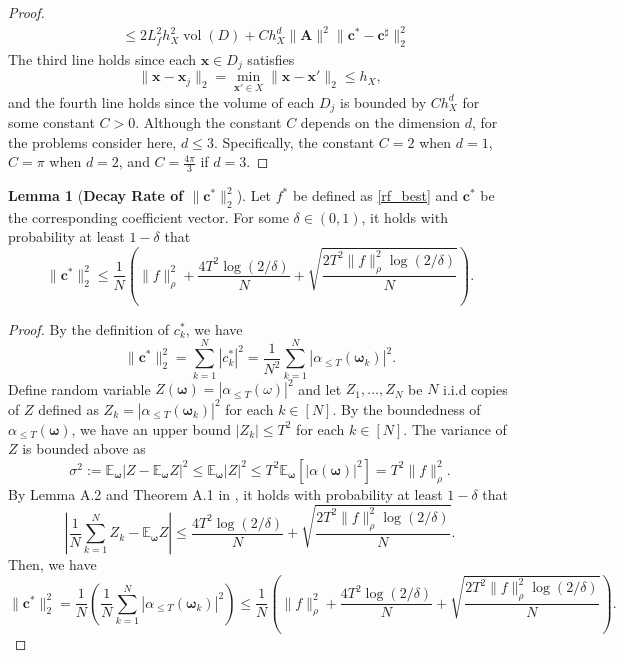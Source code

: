 \documentclass[11pt,twoside]{article}
\theoremstyle{plain}
\theoremstyle{definition}
\newtheorem{lemma}{Lemma}[section]
\theoremstyle{remark}
\newcommand{\E}{\mathbb{E}}
\newcommand{\Ab}{\mathbf{A}}
\newcommand{\xb}{\mathbf{x}}
\newcommand{\cb}{\mathbf{c}}
\newcommand{\vol}{\mathop{\mathrm{vol}}}
\newcommand{\omegab}{\boldsymbol\omega}
\begin{document}
\begin{proof}
\begin{equation}
\begin{aligned}
& \leq 2L_f^2h_X^2\vol(D) + Ch_X^d\|\Ab\|^2 \| \cb^* - \cb^\sharp\|_2^2
\end{aligned}
\end{equation}
The third line holds since each $\xb\in D_j$ satisfies 
\begin{equation*}
\|\xb - \xb_j \|_2 = \min_{\xb'\in X} \|\xb-\xb'\|_2 \leq h_X,
\end{equation*}
and the fourth line holds since the volume of each $D_j$ is bounded by $Ch_X^d$ for some constant $C>0$. Although the constant $C$ depends on the dimension $d$, for the problems consider here, $d\leq3$. Specifically, the constant $C=2$ when $d=1$, $C=\pi$ when $d=2$, and $C=\frac{4\pi}{3}$ if $d=3$. 
\end{proof}

\begin{lemma}[{\bf Decay Rate of $\|\cb^*\|_2^2$}]
\label{decay_c}
Let $f^*$ be defined as \eqref{rf_best} and $\cb^*$ be the corresponding coefficient vector. For some $\delta\in(0,1)$, it holds with probability at least $1-\delta$ that
\begin{equation*}
\|\cb^*\|_2^2 \leq \frac{1}{N} \left( \|f\|_\rho^2 + \frac{4T^2\log(2/\delta)}{N} + \sqrt{\frac{2T^2\|f\|_\rho^2\log(2/\delta)}{N}} \right).
\end{equation*}
\end{lemma}
\begin{proof}
By the definition of $c_k^*$, we have
\begin{equation}
\|\cb^*\|_2^2 = \sum_{k=1}^N |c_k^*|^2 = \frac{1}{N^2} \sum_{k=1}^N |\alpha_{\leq T}(\omegab_k)|^2.     
\end{equation}
Define random variable $Z(\omegab) = |\alpha_{\leq T}(\omega)|^2$ and let $Z_1,\dots, Z_N$ be $N$ i.i.d copies of $Z$ defined as $Z_k = |\alpha_{\leq T}(\omegab_k)|^2$ for each $k\in[N]$.
By the boundedness of $\alpha_{\leq T}(\omegab)$, we have an upper bound $|Z_k|\leq T^2$ for each $k\in[N]$. The variance of $Z$ is bounded above as
\begin{equation*}
\sigma^2 := \E_{\omegab} |Z-\E_{\omegab} Z|^2 \leq \E_{\omegab} |Z|^2 \leq T^2\E_{\omegab} \left[ |\alpha(\omegab)|^2 \right] = T^2\|f\|^2_\rho.
\end{equation*}
By Lemma A.2 and Theorem A.1 in \cite{lanthaler2023error}, it holds with probability at least $1-\delta$ that
\begin{equation*}
\left| \frac{1}{N} \sum_{k=1}^N Z_k - \E_{\omegab} Z \right| \leq \frac{4T^2\log(2/\delta)}{N} + \sqrt{\frac{2T^2\|f\|_\rho^2\log(2/\delta)}{N}}.
\end{equation*}
Then, we have
\begin{equation*}
\|\cb^*\|_2^2 = \frac{1}{N} \left( \frac{1}{N}\sum_{k=1}^N |\alpha_{\leq T}(\omegab_k)|^2 \right) \leq \frac{1}{N} \left( \|f\|_\rho^2 + \frac{4T^2\log(2/\delta)}{N} + \sqrt{\frac{2T^2\|f\|_\rho^2\log(2/\delta)}{N}} \right).
\end{equation*}
\end{proof}
\end{document}
